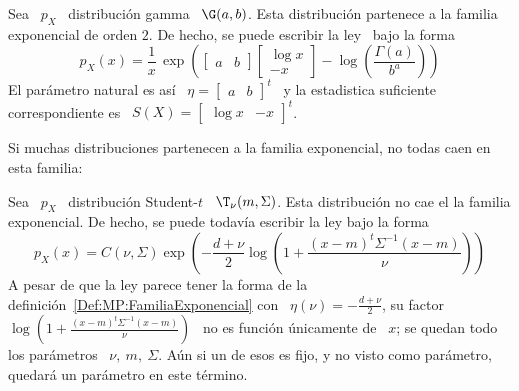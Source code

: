 \begin{ejemplo}
  Sea \ $p_X$ \ distribuci\'on gamma \ $\G(a,b)$.  Esta distribuci\'on partenece
  a la familia exponencial  de orden $2$.  De hecho, se puede  escribir la ley \
  bajo la forma
  \[
  p_X(x)     =    \frac{1}{x}    \,     \exp\left(    \begin{bmatrix}     a    &
      b \end{bmatrix} \begin{bmatrix}  \log x \\ - x  \end{bmatrix} - \log\left(
      \frac{\Gamma(a)}{b^a} \right)\right)
  \]
  El   par\'ametro  natural   es   as\'i   \  $\eta   =   \begin{bmatrix}  a   &
    b \end{bmatrix}^t$ \ y la  estadistica suficiente correspondiente es \ $S(X)
  = \begin{bmatrix} \log x & - x \end{bmatrix}^t$.
\end{ejemplo}

Si muchas distribuciones  partenecen a la familia exponencial,  no todas caen en
esta familia:
%
\begin{ejemplo}
  Sea  \   $p_X$  \   distribuci\'on  Student-$t$  \   $\T_\nu(m,\Sigma)$.  Esta
  distribuci\'on no cae el la  familia exponencial. De hecho, se puede todav\'ia
  escribir la ley bajo la forma
  \[
  p_X(x)   =  C(\nu,\Sigma)   \exp\left(  -   \frac{d+\nu}{2}  \log\left(   1  +
      \frac{(x-m)^t \Sigma^{-1} (x-m)}{\nu} \right) \right)
  \]
  A    pesar   de    que    la   ley    parece    tener   la    forma   de    la
  definici\'on~\ref{Def:MP:FamiliaExponencial}    con   \    $\eta(\nu)    =   -
  \frac{d+\nu}{2}$,  su  factor  \  $\log\left( 1  +  \frac{(x-m)^t  \Sigma^{-1}
      (x-m)}{\nu} \right)$  \ no es funci\'on  \'unicamente de \  $x$; se quedan
  todo los par\'ametros \ $\nu, \: m, \: \Sigma$. A\'un si un de esos es fijo, y
  no visto como par\'ametro, quedar\'a un par\'ametro en este t\'ermino.
\end{ejemplo}

